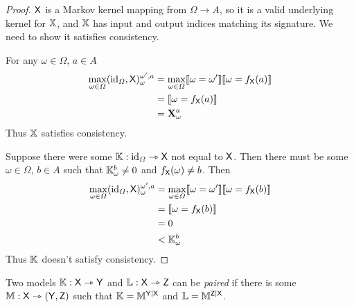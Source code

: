 \begin{proof}
$\mathsf{X}$ is a Markov kernel mapping from $\Omega\to A$, so it is a valid underlying kernel for $\mathbb{X}$, and $\mathbb{X}$ has input and output indices matching its signature. We need to show it satisfies consistency.

For any $\omega\in \Omega$, $a\in A$
\begin{align}
	\max_{\omega\in \Omega}(\text{id}_\Omega,\mathsf{X})_{\omega}^{\omega',a} &= \max_{\omega\in \Omega} \llbracket \omega = \omega' \rrbracket \llbracket \omega = f_{\mathsf{X}}(a) \rrbracket\\
	&= \llbracket \omega = f_{\mathsf{X}}(a) \rrbracket\\
	&= \mathbf{X}_\omega^a
\end{align}
Thus $\mathbb{X}$ satisfies consistency.

Suppose there were some $\mathbb{K}:\text{id}_\Omega\rightarrowtriangle \mathsf{X}$ not equal to $\mathsf{X}$. Then there must be some $\omega\in \Omega$, $b\in A$ such that $\mathbb{K}_\omega^b\neq 0$ and $f_{\mathsf{X}}(\omega)\neq b$. Then
\begin{align}
	\max_{\omega\in \Omega}(\text{id}_\Omega,\mathsf{X})_{\omega}^{\omega',a} &= \max_{\omega\in \Omega} \llbracket \omega = \omega' \rrbracket \llbracket \omega = f_{\mathsf{X}}(b) \rrbracket\\
	&= \llbracket \omega = f_{\mathsf{X}}(b) \rrbracket\\
	&= 0\\
	&< \mathbb{K}_\omega^b
\end{align}
Thus $\mathbb{K}$ doesn't satisfy consistency.
\end{proof}



\begin{definition}[Pairing]\label{def:pairing}
Two models $\mathbb{K}:\mathsf{X}\rightarrowtriangle \mathsf{Y}$ and $\mathbb{L}:\mathsf{X}\rightarrowtriangle \mathsf{Z}$ can be \emph{paired} if there is some $\mathbb{M}:\mathsf{X}\rightarrowtriangle (\mathsf{Y},\mathsf{Z})$ such that $\mathbb{K}=\mathbb{M}^{\mathsf{Y}|\mathsf{X}}$ and $\mathbb{L}=\mathbb{M}^{\mathsf{Z}|\mathsf{X}}$.
\end{definition}

